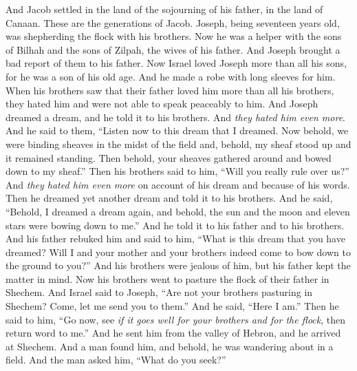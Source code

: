 \begin{biblechapter} %
 And Jacob settled in the land of the sojourning of his father, in the land of Canaan.
\verse These are the generations of Jacob. Joseph, being seventeen years old, was shepherding the flock with his brothers. Now he was a helper with the sons of Bilhah and the sons of Zilpah, the wives of his father. And Joseph brought a bad report of them to his father.
\verse Now Israel loved Joseph more than all his sons, for he was a son of his old age. And he made a robe with long sleeves for him.
\verse When his brothers saw that their father loved him more than all his brothers, they hated him and were not able to speak peaceably to him.
\verse And Joseph dreamed a dream, and he told it to his brothers. And \textit{they hated him even more}.
\verse And he said to them, “Listen now to this dream that I dreamed.
\verse Now behold, we were binding sheaves in the midst of the field and, behold, my sheaf stood up and it remained standing. Then behold, your sheaves gathered around and bowed down to my sheaf.”
\verse Then his brothers said to him, “Will you really rule over us?” And \textit{they hated him even more} on account of his dream and because of his words.
\verse Then he dreamed yet another dream and told it to his brothers. And he said, “Behold, I dreamed a dream again, and behold, the sun and the moon and eleven stars were bowing down to me.”
\verse And he told it to his father and to his brothers. And his father rebuked him and said to him, “What is this dream that you have dreamed? Will I and your mother and your brothers indeed come to bow down to the ground to you?”
\verse And his brothers were jealous of him, but his father kept the matter in mind.
 Now his brothers went to pasture the flock of their father in Shechem.
\verse And Israel said to Joseph, “Are not your brothers pasturing in Shechem? Come, let me send you to them.” And he said, “Here I am.”
\verse Then he said to him, “Go now, see \textit{if it goes well for your brothers and for the flock}, then return word to me.” And he sent him from the valley of Hebron, and he arrived at Shechem.
\verse And a man found him, and behold, he was wandering about in a field. And the man asked him, “What do you seek?”

\end{biblechapter}
